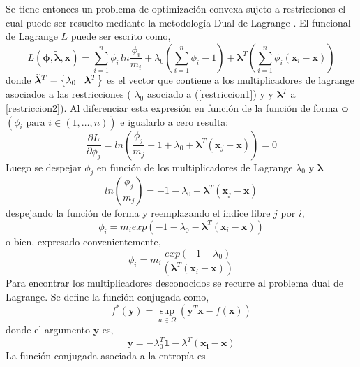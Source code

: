 Se tiene entonces un problema de optimización convexa sujeto a restricciones el cual puede ser resuelto mediante la metodología Dual de Lagrange \citep{opt-convx}. El funcional de Lagrange $L$ puede ser escrito como,
\begin{equation}
L( \bm{\phi} , \bm{\tilde{\lambda}} , \bm{x} ) = \sum_{i=1}^{n} \phi_i \, ln \frac{\phi_i}{m_i}  +  \lambda_0 \left( \sum_{i=1}^{n} \phi_i -1 \right) +  \bm{\lambda}^T \left( \sum_{i=1}^{n} \phi_i (\bm{x}_i-\bm{x}) \right) 
\end{equation}
donde $\bm{\tilde{\lambda}}^T= \left\{ \lambda_0 \hspace{0,3cm} \bm{\lambda}^T \right\}$ es el vector que contiene a los multiplicadores de lagrange asociados a las restricciones ( $\lambda_0$ asociado a (\ref{restriccion1}) y y $\bm{\lambda}^T$ a \ref{restriccion2}). Al diferenciar esta expresión en función de la función de forma $\bm{\phi}$ $(\phi_i \mbox{ para } i \in (1, \ldots, n))$ e igualarlo a cero resulta:
\begin{equation} 
\frac{\partial L}{\partial \phi_j} = ln \left( \frac{\phi_j}{m_j} + 1 + \lambda_0 + \bm{\lambda}^T (\bm{x}_j-\bm{x}) \right) = 0 
\end{equation}
Luego se despejar $\phi_j$ en función de los multiplicadores de Lagrange $\lambda_0$ y $\bm{\lambda}$
\begin{equation}
ln \left( \frac{\phi_j}{m_j} \right) = - 1 - \lambda_0 - \bm{\lambda}^T (\bm{x}_j-\bm{x}) 
\end{equation}
despejando la función de forma y reemplazando el índice libre $j$ por $i$,
\begin{equation} 
\phi_i = m_i exp ( -1 -\lambda_0 - \bm{\lambda}^T (\bm{x}_i-\bm{x}) ) 
\end{equation}
o bien, expresado convenientemente,
\begin{equation} 
\phi_i = m_i \frac{exp ( -1 -\lambda_0)} {( \bm{\lambda}^T (\bm{x}_i-\bm{x}) )} 
\end{equation}
Para encontrar los multiplicadores desconocidos se recurre al problema dual de Lagrange. Se define la función conjugada como,
\begin{equation} \label{dummy1}
f^{*}(\bm{y}) = \sup_{a\in \Omega} (\bm{y}
^T \bm{x} - f(\bm{x}))
\end{equation}
donde el argumento $\bm{y}$ es,
\begin{equation} \label{dummy2}
\bm{y} = -\lambda_0^T \bm{1} - \lambda^T (\bm{x_i}-\bm{x})
\end{equation}
La función conjugada asociada a la entropía es
